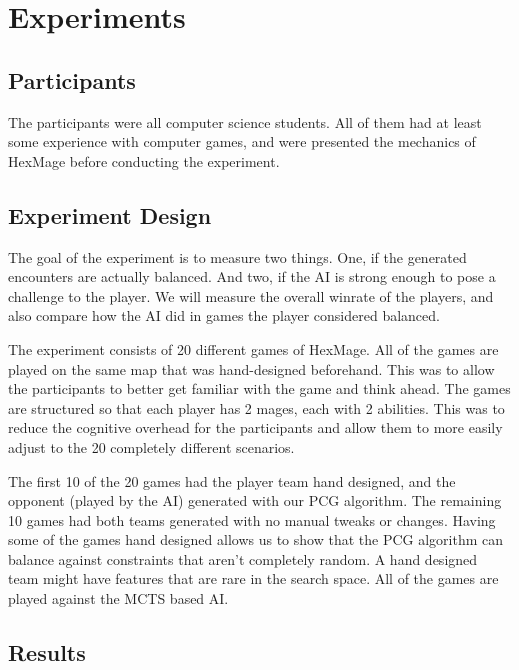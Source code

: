 \chapter{Experiments}
\label{chapter05}


\section{Participants}

The participants were all computer science students. All of them had at least
some experience with computer games, and were presented the mechanics of HexMage
before conducting the experiment.

\section{Experiment Design}

The goal of the experiment is to measure two things. One, if the generated
encounters are actually balanced. And two, if the AI is strong enough to pose a
challenge to the player. We will measure the overall winrate of the players,
and also compare how the AI did in games the player considered balanced.

The experiment consists of 20 different games of HexMage. All of the games are
played on the same map that was hand-designed beforehand. This was to allow the
participants to better get familiar with the game and think ahead. The games
are structured so that each player has 2 mages, each with 2 abilities. This was
to reduce the cognitive overhead for the participants and allow them to more easily
adjust to the 20 completely different scenarios.

The first 10 of the 20 games had the player team hand designed, and the
opponent (played by the AI) generated with our PCG algorithm. The remaining 10
games had both teams generated with no manual tweaks or changes. Having some of
the games hand designed allows us to show that the PCG algorithm can balance
against constraints that aren't completely random. A hand designed team might
have features that are rare in the search space. All of the games are played
against the MCTS based AI\@.

\section{Results}


